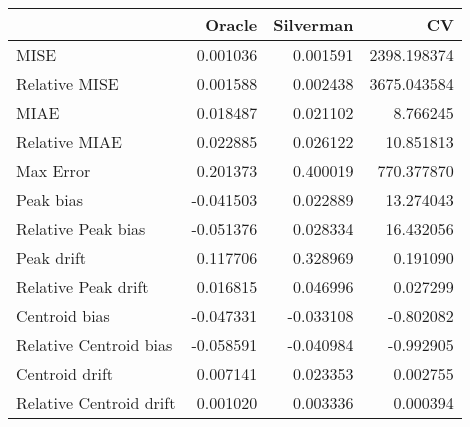 \begin{tabular}{lrrr}
  \hline
 & Oracle & Silverman & CV \\ 
  \hline
MISE & 0.001036 & 0.001591 & 2398.198374 \\ 
  Relative MISE & 0.001588 & 0.002438 & 3675.043584 \\ 
  MIAE & 0.018487 & 0.021102 & 8.766245 \\ 
  Relative MIAE & 0.022885 & 0.026122 & 10.851813 \\ 
  Max Error & 0.201373 & 0.400019 & 770.377870 \\ 
  Peak bias & -0.041503 & 0.022889 & 13.274043 \\ 
  Relative Peak bias & -0.051376 & 0.028334 & 16.432056 \\ 
  Peak drift & 0.117706 & 0.328969 & 0.191090 \\ 
  Relative Peak drift & 0.016815 & 0.046996 & 0.027299 \\ 
  Centroid bias & -0.047331 & -0.033108 & -0.802082 \\ 
  Relative Centroid bias & -0.058591 & -0.040984 & -0.992905 \\ 
  Centroid drift & 0.007141 & 0.023353 & 0.002755 \\ 
  Relative Centroid drift & 0.001020 & 0.003336 & 0.000394 \\ 
   \hline
\end{tabular}
